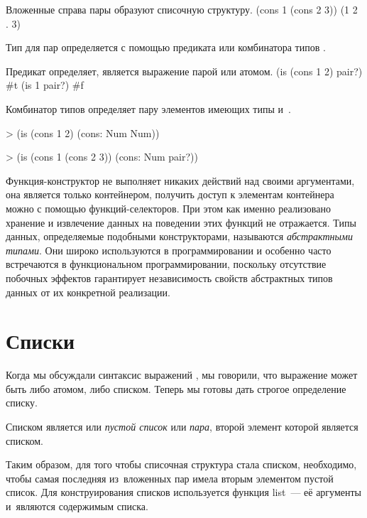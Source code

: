 \begin{example}{%
Вложенные справа пары образуют списочную структуру.}
\REPL
  {(cons 1 (cons 2 3))}
  {(1 2 . 3)}
\end{example}

Тип для пар определяется с помощью предиката  или комбинатора типов .

\begin{example}{%
Предикат  определяет, является выражение парой или атомом.}
\REPL
  {(is (cons 1 2) pair?)}
  {\#t}
\REPL
  {(is 1 pair?)}
  {\#f}
\end{example}

\begin{example}{%
Комбинатор типов  определяет пару элементов имеющих типы  и~.}
\begin{ExampleCode}
> (is (cons 1 2) 
      (cons: Num Num))
\end{ExampleCode}
\begin{ExampleCode}
> (is (cons 1 (cons 2 3)) 
      (cons: Num pair?))
\end{ExampleCode}
\end{example}
 
Функция-конструктор  не выполняет никаких действий над своими аргументами, она является только контейнером, получить доступ к элементам контейнера можно с помощью функций-селекторов. При этом как именно реализовано хранение и извлечение данных на поведении этих функций не отражается. Типы данных, определяемые подобными конструкторами, называются \emph{абстрактными типами}. Они широко используются в программировании и особенно часто встречаются в функциональном программировании, поскольку отсутствие побочных эффектов гарантирует независимость свойств абстрактных типов данных от их конкретной реализации.

\section[2]{Списки}%
%
Когда мы обсуждали синтаксис выражений \Scheme, мы говорили, что выражение может быть либо атомом, либо списком. Теперь мы готовы дать строгое определение списку.

Списком является или \emph{пустой список}  или \emph{пара}, второй элемент которой является списком. 

Таким образом, для того чтобы списочная структура стала списком, необходимо, чтобы самая последняя из~вложенных пар имела вторым элементом пустой список. Для конструирования списков используется функция \si{list}~--- её аргументы и~являются содержимым списка.

